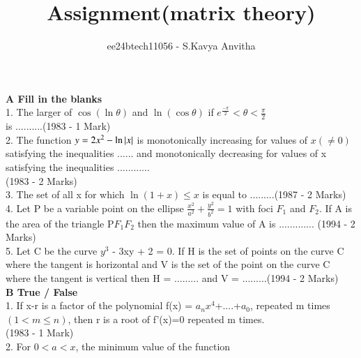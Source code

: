 \documentclass[journal,12pt,twocolumn]{IEEEtran}
\theoremstyle{remark}
\begin{document}

\vspace{3cm}

\title{Assignment(matrix theory)}
\author{ee24btech11056 - S.Kavya Anvitha}
\maketitle
\textbf{A Fill in the blanks}\\[6pt]
1.  The larger of $\cos (\ln \theta)$ and  $\ln (\cos \theta)$ if
$e^{\frac{-\pi}{2}}< \theta< \frac{\pi}{2}$\\[2pt] 
\indent is ..........\hspace{4.3cm}(1983 - 1 Mark)\\[3pt]
 2.  The function $y=2x^{2}-\ln \left\vert x\right\vert$ is monotonically \indent increasing
 for values of $x(\neq0)$ satisfying the \indent inequalities ...... and
 monotonically decreasing for \indent values of x satisfying the inequalities 
 ............\\[2pt]\indent\hspace{5.5cm}(1983 - 2 Marks)\\[3pt]
3.  The set of all x for which $\ln (1+x) \leq x$ is equal \indent
to .........\hspace{4cm}(1987 - 2 Marks)\\[3pt]
4.  Let P be a variable point on the ellipse $\frac{x^2}{a^2}+\frac{y^2}{b^2} = 1$
\indent with foci $F_1$ and $F_2$. If A is the area of the \indent triangle 
P$F_1$$F_2$ then the maximum value of A is \hspace{5cm}\indent............. 
\hspace{3.6cm}(1994 - 2 Marks)\\[3pt]
5.  Let C be the curve $y^3$ - 3xy + 2 = 0. If H is the \indent set of
points on the curve C where the tangent \indent is horizontal and V is
the set of the point on the \indent curve C where the tangent is vertical
then H = \indent ......... and V = .........\hspace{1.7cm}(1994 - 2 Marks)\\[6pt]
\indent\hspace{0.3cm}\textbf{B True / False}\\[6pt]
1. If x-r is a factor of the polynomial f(x) = \indent $a_n$$x^4$+....+$a_0$,
repeated m times $(1< m\leq n)$, then \indent r is a root of f'(x)=0 
repeated m times.\\[2pt]
\indent \hspace{5.5cm}(1983 - 1 Mark)\\[3pt]
2.  For $0 < a < x$, the minimum value of the function \indent 
\end{document}
